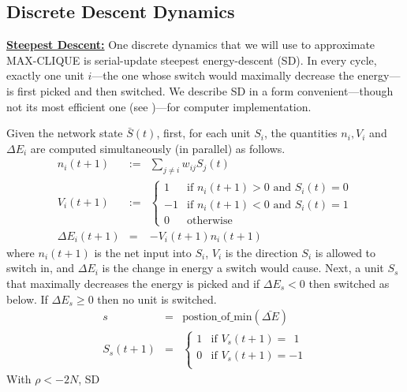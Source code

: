 \subsection*{Discrete Descent Dynamics}
\label{DDD}
{\underline{\bf Steepest Descent:}}
One discrete dynamics that we will use to approximate MAX-CLIQUE is
serial-update steepest energy-descent (SD).
In every cycle,
exactly one unit $i$---the one whose switch would maximally decrease 
the energy---is first picked and then switched. We describe SD in 
a form convenient---though not its most efficient
one (see \cite{kn:tr9002})---for computer implementation. \par
Given the network state $\bar{S}(t)$, first, for each
unit $S_i$, the 
quantities $n_i, V_i$ and $\Delta E_i$ are computed simultaneously
(in parallel) as follows. 
\begin{eqnarray}
n_i(t+1) & := & \sum_{j \neq i} w_{ij}  S_j(t) \\ \label{eq:HcN3}
V_i(t+1) & := &
\left\{ 
\begin{array}{rl}
1 & \mbox{if $n_i(t+1) > 0$ and $S_i(t) = 0$} \nonumber \\
-1 & \mbox{if $n_i(t+1) < 0$ and $S_i(t) = 1$} \nonumber \\
0 & \mbox{otherwise}
\end{array} 
\right. \nonumber \\
\Delta E_i(t+1)  &  =  &- V_i(t+1) n_i(t+1) \label{eq:HcN4} 
\end{eqnarray}
where $n_i(t+1)$ is the net input into $S_i$, $V_i$
is the direction $S_i$ is allowed to switch in, and $\Delta E_i$
is the change in energy a switch would cause. 
Next, 
a unit $S_s$ that maximally decreases the energy is picked 
and if $\Delta E_s < 0$ then switched as below.
If $\Delta E_s \geq 0$ then no unit is switched.
\begin{eqnarray}
s & = & \mbox{postion\_of\_min}(\bar{\Delta E}) \label{eq:HcN5} \\
S_s(t+1)  & = &
\left\{ 
\begin{array}{rl}
1 & \mbox{if $V_s(t+1) = ~~1$} \\
0 & \mbox{if $V_s(t+1) = -1$} \\
\end{array} 
\right. 
\end{eqnarray}
With $\rho < -2 N$, SD 
